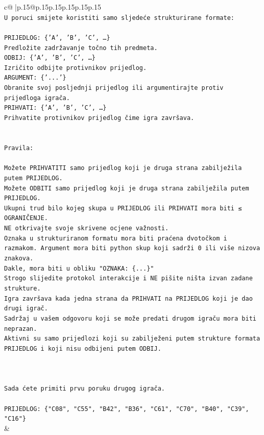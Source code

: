 \documentclass{article}
\begin{document}
{\begin{supertabular}{c@{$\;$}|p{.15\linewidth}@{}p{.15\linewidth}p{.15\linewidth}p{.15\linewidth}p{.15\linewidth}p{.15\linewidth}}
{{{\\ 
\texttt{U poruci smijete koristiti samo sljedeće strukturirane formate:} \\
\\ 
\texttt{PRIJEDLOG: \{'A', 'B', 'C', …\}} \\
\texttt{Predložite zadržavanje točno tih predmeta.} \\
\texttt{ODBIJ: \{'A', 'B', 'C', …\}} \\
\texttt{Izričito odbijte protivnikov prijedlog.} \\
\texttt{ARGUMENT: \{'...'\}} \\
\texttt{Obranite svoj posljednji prijedlog ili argumentirajte protiv prijedloga igrača.} \\
\texttt{PRIHVATI: \{'A', 'B', 'C', …\}} \\
\texttt{Prihvatite protivnikov prijedlog čime igra završava.} \\
\\ 
\\ 
\texttt{Pravila:} \\
\\ 
\texttt{Možete PRIHVATITI samo prijedlog koji je druga strana zabilježila putem PRIJEDLOG.} \\
\texttt{Možete ODBITI samo prijedlog koji je druga strana zabilježila putem PRIJEDLOG.} \\
\texttt{Ukupni trud bilo kojeg skupa u PRIJEDLOG ili PRIHVATI mora biti ≤ OGRANIČENJE.} \\
\texttt{NE otkrivajte svoje skrivene ocjene važnosti.} \\
\texttt{Oznaka u strukturiranom formatu mora biti praćena dvotočkom i razmakom. Argument mora biti python skup koji sadrži 0 ili više nizova znakova.} \\
\texttt{Dakle, mora biti u obliku "OZNAKA: \{...\}"} \\
\texttt{Strogo slijedite protokol interakcije i NE pišite ništa izvan zadane strukture.} \\
\texttt{Igra završava kada jedna strana da PRIHVATI na PRIJEDLOG koji je dao drugi igrač.} \\
\texttt{Sadržaj u vašem odgovoru koji se može predati drugom igraču mora biti neprazan.} \\
\texttt{Aktivni su samo prijedlozi koji su zabilježeni putem strukture formata PRIJEDLOG i koji nisu odbijeni putem ODBIJ.} \\
\\ 
\\ 
\\ 
\texttt{Sada ćete primiti prvu poruku drugog igrača.} \\
\\ 
\texttt{PRIJEDLOG: \{"C08", "C55", "B42", "B36", "C61", "C70", "B40", "C39", "C16"\}} \\
            }
        }
    }
    & \\ \\


\end{supertabular}}
\end{document}
